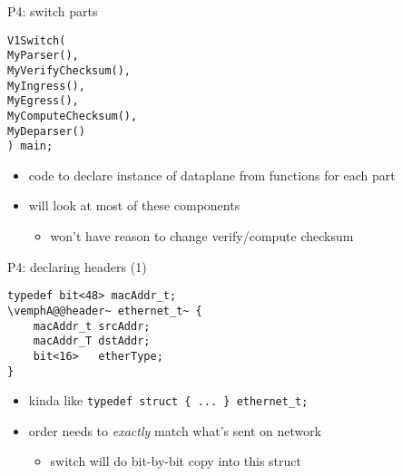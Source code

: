 \begin{frame}[fragile]{P4: switch parts}
\begin{Verbatim}
V1Switch(
MyParser(),
MyVerifyChecksum(),
MyIngress(),
MyEgress(),
MyComputeChecksum(),
MyDeparser()
) main;
\end{Verbatim}
\begin{itemize}
\item code to declare instance of dataplane from functions for each part
\item will look at most of these components
    \begin{itemize}
    \item won't have reason to change verify/compute checksum
    \end{itemize}
\end{itemize}
\end{frame}

\begin{frame}[fragile]{P4: declaring headers (1)}
\providecommand{\vemphA}[1]{\myemph<2>{#1}}
\providecommand{\vemphB}[1]{\myemph<3>{#1}}
\providecommand{\vemphC}[1]{\myemph<4>{#1}}
\providecommand{\vemphD}[1]{\myemph<5>{#1}}
\begin{Verbatim}[fontsize=\small,commandchars=\\@~]
typedef bit<48> macAddr_t;
\vemphA@@header~ ethernet_t~ {
    macAddr_t srcAddr;
    macAddr_T dstAddr;
    bit<16>   etherType;
}
\end{Verbatim}
\begin{itemize}
\item<2-> kinda like \Verb|typedef struct { ... } ethernet_t;|
\item<3-> order needs to \textit{exactly} match what's sent on network
    \begin{itemize}
    \item switch will do bit-by-bit copy into this struct
    \end{itemize}
\end{itemize}
\end{frame}

